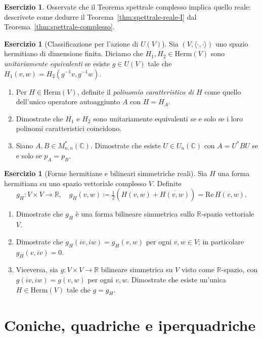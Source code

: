 \documentclass[11pt, a4paper]{book}
\theoremstyle{definition}
\newtheorem{esercizio}[definizione]{Esercizio}
\theoremstyle{plain}
\theoremstyle{remark}
\newcommand{\R}{\mathbb{R}}
\newcommand{\C}{\mathbb{C}}
\begin{document}
\begin{esercizio}
Osservate che il Teorema spettrale complesso implica quello reale: descrivete come dedurre il Teorema~\ref{thm:spettrale-reale-I} dal Teorema~\ref{thm:spettrale-complesso}.
\end{esercizio}

\begin{esercizio}[Classificazione per l'azione di $U(V)$]
Sia $(V,\langle\cdot,\cdot\rangle)$ uno spazio hermitiano di dimensione finita. Diciamo che $H_1, H_2 \in \mathrm{Herm}(V)$ sono \emph{unitariamente equivalenti} se esiste $g \in U(V)$ tale che $H_1(v,w) = H_2(g^{-1}v,g^{-1}w)$.
\begin{enumerate}[label=(\alph*)]
  \item Per $H \in \mathrm{Herm}(V)$, definite il \emph{polinomio caratteristico di $H$} come quello dell'unico operatore autoaggiunto $A$ con $H = H_A$.
  \item Dimostrate che $H_1$ e $H_2$ sono unitariamente equivalenti se e solo se i loro polinomi caratteristici coincidono.
  \item Siano $A, B \in M^*_{n,n}(\C)$. Dimostrate che esiste $U \in U_n(\C)$ con $A = U^* B U$ se e solo se $p_A = p_B$.
\end{enumerate}
\end{esercizio}

\begin{esercizio}[Forme hermitiane e bilineari simmetriche reali]
Sia $H$ una forma hermitiana su uno spazio vettoriale complesso $V$. Definite
\[
  g_H \colon V \times V \to \R, \quad g_H(v,w) \coloneqq \tfrac{1}{2}(H(v,w)+\overline{H(v,w)}) = \mathrm{Re}\,H(v,w).
\]
\begin{enumerate}[label=(\alph*)]
  \item Dimostrate che $g_H$ è una forma bilineare simmetrica sullo $\R$-spazio vettoriale $V$.
  \item Dimostrate che $g_H(iv,iw) = g_H(v,w)$ per ogni $v,w \in V$; in particolare $g_H(v,iv) = 0$.
  \item Viceversa, sia $g \colon V \times V \to \R$ bilineare simmetrica su $V$ visto come $\R$-spazio, con $g(iv,iw) = g(v,w)$ per ogni $v,w$. Dimostrate che esiste un'unica $H \in \mathrm{Herm}(V)$ tale che $g = g_H$.
\end{enumerate}
\end{esercizio}

\chapter{Coniche, quadriche e iperquadriche}
\label{cap:coniche}
\end{document}
